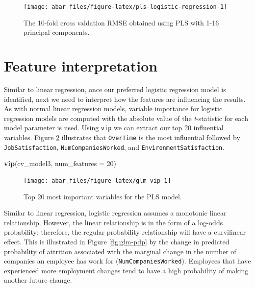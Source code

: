 \documentclass[]{book}
\newenvironment{Shaded}{\begin{snugshade}}{\end{snugshade}}
\newcommand{\DataTypeTok}[1]{\textcolor[rgb]{0.13,0.29,0.53}{#1}}
\newcommand{\DecValTok}[1]{\textcolor[rgb]{0.00,0.00,0.81}{#1}}
\newcommand{\KeywordTok}[1]{\textcolor[rgb]{0.13,0.29,0.53}{\textbf{#1}}}
\newcommand{\NormalTok}[1]{#1}
\theoremstyle{definition}
\theoremstyle{definition}
\theoremstyle{definition}
\theoremstyle{remark}
\begin{document}
\begin{figure}

{\centering \texttt{[image: abar\_files/figure-latex/pls-logistic-regression-1]} 

}

\caption{The 10-fold cross valdation RMSE obtained using PLS with 1-16 principal components.}\label{fig:pls-logistic-regression}
\end{figure}

\hypertarget{feature-interpretation}{%
\section{Feature interpretation}\label{feature-interpretation}}

Similar to linear regression, once our preferred logistic regression
model is identified, next we need to interpret how the features are
influencing the results. As with normal linear regression models,
variable importance for logistic regression models are computed with the
absolute value of the \emph{t}-statistic for each model parameter is
used. Using \texttt{vip} we can extract our top 20 influential
variables. Figure \ref{fig:glm-vip} illustrates that \texttt{OverTime}
is the most influential followed by \texttt{JobSatisfaction},
\texttt{NumCompaniesWorked}, and \texttt{EnvironmentSatisfaction}.

\begin{Shaded}
\begin{Highlighting}[]
\KeywordTok{vip}\NormalTok{(cv_model3, }\DataTypeTok{num_features =} \DecValTok{20}\NormalTok{)}
\end{Highlighting}
\end{Shaded}

\begin{figure}

{\centering \texttt{[image: abar\_files/figure-latex/glm-vip-1]} 

}

\caption{Top 20 most important variables for the PLS model.}\label{fig:glm-vip}
\end{figure}

Similar to linear regression, logistic regression assumes a monotonic
linear relationship. However, the linear relationship is in the form of
a log-odds probability; therefore, the regular probability relationship
will have a curvilinear effect. This is illustrated in Figure
\ref{fig:glm-pdp} by the change in predicted probability of attrition
associated with the marginal change in the number of companies an
employee has work for (\texttt{NumCompaniesWorked}). Employees that have
experienced more employment changes tend to have a high probability of
making another future change.
\end{document}
